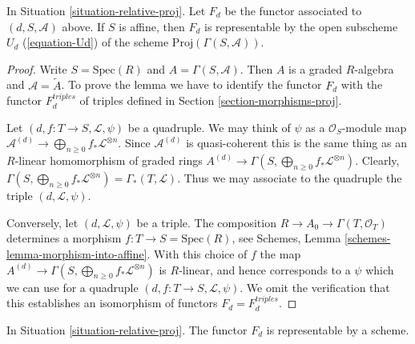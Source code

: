 \begin{lemma}
\label{lemma-relative-proj-affine}
In Situation \ref{situation-relative-proj}. Let $F_d$ be the functor
associated to $(d, S, \mathcal{A})$ above.
If $S$ is affine, then $F_d$ is representable by the open subscheme
$U_d$ (\ref{equation-Ud})
of the scheme $\text{Proj}(\Gamma(S, \mathcal{A}))$.
\end{lemma}

\begin{proof}
Write $S = \text{Spec}(R)$ and $A = \Gamma(S, \mathcal{A})$.
Then $A$ is a graded $R$-algebra and $\mathcal{A} = \widetilde A$.
To prove the lemma we have to identify the functor $F_d$
with the functor $F_d^{triples}$ of triples defined in Section
\ref{section-morphisms-proj}.

\medskip\noindent
Let $(d, f : T \to S, \mathcal{L}, \psi)$ be a quadruple.
We may think of $\psi$ as a $\mathcal{O}_S$-module map
$\mathcal{A}^{(d)} \to \bigoplus_{n \geq 0} f_*\mathcal{L}^{\otimes n}$.
Since $\mathcal{A}^{(d)}$ is quasi-coherent this is the same
thing as an $R$-linear homomorphism of graded rings
$A^{(d)} \to \Gamma(S, \bigoplus_{n \geq 0} f_*\mathcal{L}^{\otimes n})$.
Clearly, $\Gamma(S, \bigoplus_{n \geq 0} f_*\mathcal{L}^{\otimes n}) =
\Gamma_*(T, \mathcal{L})$. Thus we may associate to
the quadruple the triple $(d, \mathcal{L}, \psi)$.

\medskip\noindent
Conversely, let $(d, \mathcal{L}, \psi)$ be a triple.
The composition $R \to A_0 \to \Gamma(T, \mathcal{O}_T)$
determines a morphism $f : T \to S = \text{Spec}(R)$, see
Schemes, Lemma \ref{schemes-lemma-morphism-into-affine}.
With this choice of $f$ the map
$A^{(d)} \to \Gamma(S, \bigoplus_{n \geq 0} f_*\mathcal{L}^{\otimes n})$
is $R$-linear, and hence corresponds to a $\psi$ which we
can use for a quadruple $(d, f : T \to S, \mathcal{L}, \psi)$.
We omit the verification that this establishes an isomorphism
of functors $F_d = F_d^{triples}$.
\end{proof}

\begin{lemma}
\label{lemma-relative-proj-d}
In Situation \ref{situation-relative-proj}.
The functor $F_d$ is representable by a scheme.
\end{lemma}

